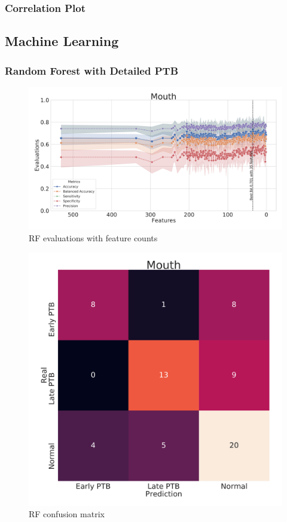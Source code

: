 \documentclass{beamer}
\begin{document}
    \begin{frame}
        \frametitle{Correlation Plot}
    \end{frame}

    \subsection{Machine Learning}
    \begin{frame}[allowframebreaks]
        \frametitle{Random Forest with Detailed PTB}

        \begin{figure}
            \includegraphics[width=0.8 \linewidth]{figures/RandomForest/RF.DADA2.homd/Mouth+metrics.pdf}
            \caption{RF evaluations with feature counts}
        \end{figure}

        \begin{figure}
            \includegraphics[width=0.5 \linewidth]{figures/RandomForest/RF.DADA2.homd/Mouth+heatmap.pdf}
            \caption{RF confusion matrix}
        \end{figure}


\end{frame}
\end{document}

